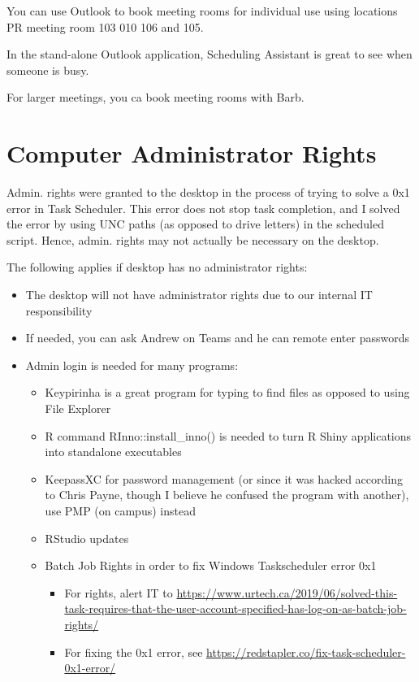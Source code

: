 \documentclass[
  letterpaper,
  DIV=11,
  numbers=noendperiod,
  oneside]{scrreprt}
\begin{document}
You can use Outlook to book meeting rooms for individual use using
locations PR meeting room 103 010 106 and 105.

In the stand-alone Outlook application, Scheduling Assistant is great to
see when someone is busy.

For larger meetings, you ca book meeting rooms with Barb.

\hypertarget{computer-administrator-rights}{%
\section{Computer Administrator
Rights}\label{computer-administrator-rights}}

Admin. rights were granted to the desktop in the process of trying to
solve a 0x1 error in Task Scheduler. This error does not stop task
completion, and I solved the error by using UNC paths (as opposed to
drive letters) in the scheduled script. Hence, admin. rights may not
actually be necessary on the desktop.

The following applies if desktop has no administrator rights:

\begin{itemize}
\item
  The desktop will not have administrator rights due to our internal IT
  responsibility
\item
  If needed, you can ask Andrew on Teams and he can remote enter
  passwords
\item
  Admin login is needed for many programs:

  \begin{itemize}
  \item
    Keypirinha is a great program for typing to find files as opposed to
    using File Explorer
  \item
    R command RInno::install\_inno() is needed to turn R Shiny
    applications into standalone executables
  \item
    KeepassXC for password management (or since it was hacked according
    to Chris Payne, though I believe he confused the program with
    another), use PMP (on campus) instead
  \item
    RStudio updates
  \item
    Batch Job Rights in order to fix Windows Taskscheduler error 0x1

    \begin{itemize}
    \item
      For rights, alert IT to
      \url{https://www.urtech.ca/2019/06/solved-this-task-requires-that-the-user-account-specified-has-log-on-as-batch-job-rights/}
    \item
      For fixing the 0x1 error, see
      \url{https://redstapler.co/fix-task-scheduler-0x1-error/}
    \end{itemize}
  \end{itemize}
\end{itemize}
\end{document}
